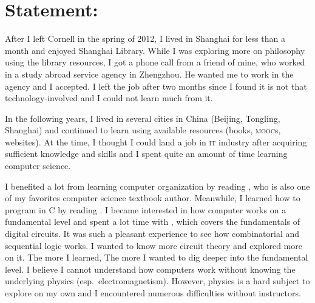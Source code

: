 


\usepackage[font={scriptsize,it}]{caption}
\usepackage{metalogo,alltt,soul,tikz,standalone,wrapfig,csquotes}
\usetikzlibrary{calc}
\usepackage{biblatex} %



\newcommand*{\TikZ}{PGF/\kern1bpTi\kern.5bp\textit{k}Z}


%		

	\onum
	
	\section*{Statement:}
	After I left Cornell in the spring of 2012, I lived in Shanghai for less
	than a month and enjoyed Shanghai Library. While I was exploring more on
	philosophy using the library resources, I got a phone call from a friend of
	mine, who worked in a study abroad service agency in Zhengzhou. He wanted me to
	work in the agency and I accepted. I left the job after two months since I
	found it is not that technology-involved and I could not learn much from it.
	
	In the following years, I lived in several cities in China (Beijing, Tongling,
	Shanghai) and continued to learn using available resources (books, \textsc{mooc}s,
	websites). At the time, I thought I could land a job in \textsc{it} industry after
	acquiring sufficient knowledge and skills and I spent quite an amount of time
	learning computer science.
	
	I benefited a lot from learning computer organization by reading
	\textcite{COA8e}, who is also one of my favorites computer science textbook
	author. Meanwhile, I learned how to program in C by reading \textcite{K&R}. I
	became interested in how computer works on a fundamental level and spent a lot
	time with \textcite{LCDF}, which covers the fundamentals of digital circuits.
	It was such a pleasant experience to see how combinatorial and sequential logic
	works. I wanted to know more circuit theory and explored more on it. The more I
	learned, The more I wanted to dig deeper into the fundamental level. I believe
	I cannot understand how computers work without knowing the underlying physics
	(esp.~electromagnetism). However, physics is a hard subject to explore on my
	own and I encountered numerous difficulties without instructors.
	

